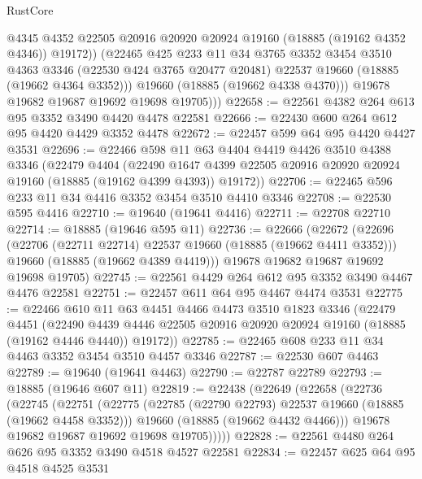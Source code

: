 \begin{lexlean}{RustCore}
\begin{coremodule}
                @4345
                @4352
                @22505
                @20916
                @20920
                @20924
                @19160
                (@18885 (@19162 @4352 @4346))
                @19172))
            (@22465
              @425
              @233
              @11
              @34
              @3765
              @3352
              @3454
              @3510
              @4363
              @3346
              (@22530 @424 @3765 @20477 @20481)
              @22537
              @19660
              (@18885 (@19662 @4364 @3352)))
            @19660
            (@18885 (@19662 @4338 @4370)))
          @19678
          @19682
          @19687
          @19692
          @19698
          @19705)))
@22658 := @22561 @4382 @264 @613 @95 @3352 @3490 @4420 @4478 @22581
@22666 := @22430 @600 @264 @612 @95 @4420 @4429 @3352 @4478
@22672 := @22457 @599 @64 @95 @4420 @4427 @3531
@22696 := @22466
    @598
    @11
    @63
    @4404
    @4419
    @4426
    @3510
    @4388
    @3346
    (@22479
      @4404
      (@22490 @1647 @4399 @22505 @20916 @20920 @20924 @19160 (@18885 (@19162 @4399 @4393)) @19172))
@22706 := @22465 @596 @233 @11 @34 @4416 @3352 @3454 @3510 @4410 @3346
@22708 := @22530 @595 @4416
@22710 := @19640 (@19641 @4416)
@22711 := @22708 @22710
@22714 := @18885 (@19646 @595 @11)
@22736 := @22666
    (@22672
      (@22696
        (@22706 (@22711 @22714) @22537 @19660 (@18885 (@19662 @4411 @3352)))
        @19660
        (@18885 (@19662 @4389 @4419)))
      @19678
      @19682
      @19687
      @19692
      @19698
      @19705)
@22745 := @22561 @4429 @264 @612 @95 @3352 @3490 @4467 @4476 @22581
@22751 := @22457 @611 @64 @95 @4467 @4474 @3531
@22775 := @22466
    @610
    @11
    @63
    @4451
    @4466
    @4473
    @3510
    @1823
    @3346
    (@22479
      @4451
      (@22490 @4439 @4446 @22505 @20916 @20920 @20924 @19160 (@18885 (@19162 @4446 @4440)) @19172))
@22785 := @22465 @608 @233 @11 @34 @4463 @3352 @3454 @3510 @4457 @3346
@22787 := @22530 @607 @4463
@22789 := @19640 (@19641 @4463)
@22790 := @22787 @22789
@22793 := @18885 (@19646 @607 @11)
@22819 := @22438
    (@22649
      (@22658
        (@22736
          (@22745
            (@22751
              (@22775
                (@22785 (@22790 @22793) @22537 @19660 (@18885 (@19662 @4458 @3352)))
                @19660
                (@18885 (@19662 @4432 @4466)))
              @19678
              @19682
              @19687
              @19692
              @19698
              @19705)))))
@22828 := @22561 @4480 @264 @626 @95 @3352 @3490 @4518 @4527 @22581
@22834 := @22457 @625 @64 @95 @4518 @4525 @3531

\end{coremodule}
\end{lexlean}
